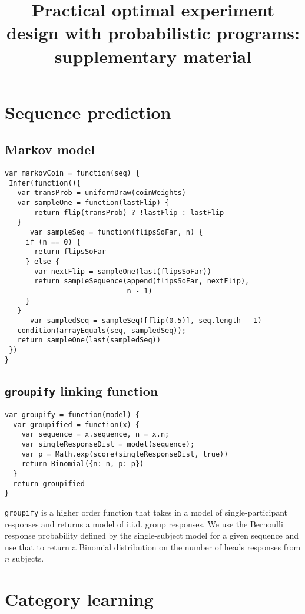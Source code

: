 \documentclass{article}
\title{Practical optimal experiment design with probabilistic programs: supplementary material}
\begin{document}

\maketitle

\section{Sequence prediction}

\subsection{Markov model}

\begin{lstlisting}[upquote=true]
var markovCoin = function(seq) {
 Infer(function(){
   var transProb = uniformDraw(coinWeights)
   var sampleOne = function(lastFlip) {
       return flip(transProb) ? !lastFlip : lastFlip
   }
	  var sampleSeq = function(flipsSoFar, n) {
     if (n == 0) {
       return flipsSoFar
     } else {
       var nextFlip = sampleOne(last(flipsSoFar))
       return sampleSequence(append(flipsSoFar, nextFlip),
                             n - 1)
     }
   }
	  var sampledSeq = sampleSeq([flip(0.5)], seq.length - 1)
   condition(arrayEquals(seq, sampledSeq));
   return sampleOne(last(sampledSeq))
 })
}
\end{lstlisting}

\subsection{\texttt{groupify} linking function}

\begin{lstlisting}[upquote=true]
var groupify = function(model) {
  var groupified = function(x) {
    var sequence = x.sequence, n = x.n;
    var singleResponseDist = model(sequence);
    var p = Math.exp(score(singleResponseDist, true))
    return Binomial({n: n, p: p})
  }
  return groupified
}
\end{lstlisting}

\lstinline{groupify} is a higher order function that takes in a model of single-participant responses and returns a model of i.i.d. group responses.
We use the Bernoulli response probability defined by the single-subject model for a given sequence and use that to return a Binomial distribution on the number of heads responses from $n$ subjects.

\section{Category learning}
\end{document}
